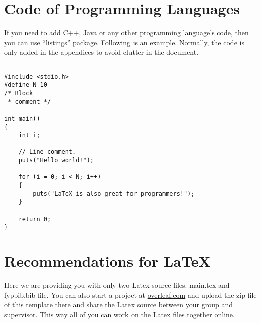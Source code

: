 \documentclass{FastFyp}
\begin{document}
\section{Code of Programming Languages}
If you need to add C++, Java or any other programming language's code, then you can use ``listings'' package. Following is an example. Normally, the code is only added in the appendices to avoid clutter in the document.

\begin{lstlisting}

#include <stdio.h>
#define N 10
/* Block
 * comment */

int main()
{
    int i;

    // Line comment.
    puts("Hello world!");
    
    for (i = 0; i < N; i++)
    {
        puts("LaTeX is also great for programmers!");
    }

    return 0;
}
\end{lstlisting}

\section{Recommendations for \LaTeX}
Here we are providing you with only two Latex source files.  main.tex and fypbib.bib file. You can also start a project at \url{overleaf.com} and upload the zip file of this template there and share the Latex source between your group and supervisor.  This way all of you can work on the Latex files together online.
\end{document}
